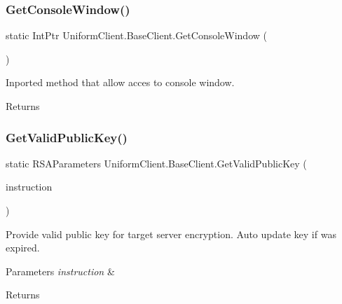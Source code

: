 \subsubsection{\texorpdfstring{Get\+Console\+Window()}{GetConsoleWindow()}}
{\footnotesize\ttfamily static Int\+Ptr Uniform\+Client.\+Base\+Client.\+Get\+Console\+Window (\begin{DoxyParamCaption}{ }\end{DoxyParamCaption})\hspace{0.3cm}{\ttfamily [protected]}}



Inported method that allow acces to console window. 

\begin{DoxyReturn}{Returns}

\end{DoxyReturn}
\mbox{\label{class_uniform_client_1_1_base_client_ad965aab32fccb9b6bcd9e6a576195f6f}} 
\subsubsection{\texorpdfstring{Get\+Valid\+Public\+Key()}{GetValidPublicKey()}}
{\footnotesize\ttfamily static R\+S\+A\+Parameters Uniform\+Client.\+Base\+Client.\+Get\+Valid\+Public\+Key (\begin{DoxyParamCaption}\item[{\mbox{\hyperlink{class_pipes_provider_1_1_networking_1_1_routing_1_1_instruction}{Pipes\+Provider.\+Networking.\+Routing.\+Instruction}}}]{instruction }\end{DoxyParamCaption})\hspace{0.3cm}{\ttfamily [static]}}



Provide valid public key for target server encryption. Auto update key if was expired. 


\begin{DoxyParams}{Parameters}
{\em instruction} & \\
\hline
\end{DoxyParams}
\begin{DoxyReturn}{Returns}

\end{DoxyReturn}
\mbox{\label{class_uniform_client_1_1_base_client_a8b0bf0f5c032239a7b1bdc73d2d5ad3d}} 
